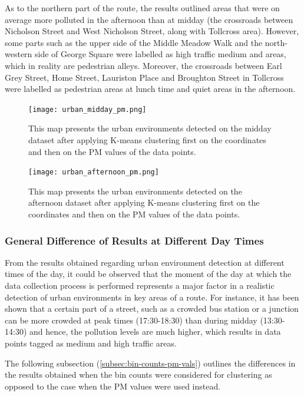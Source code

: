 \documentclass[bsc,frontabs,twoside,singlespacing,parskip,deptreport]{infthesis}     %
\begin{document}
As to the northern part of the route, the results outlined areas that were on average more polluted in the afternoon than at midday (the crossroads between Nicholson Street and West Nicholson Street, along with Tollcross area). However, some parts such as the upper side of the Middle Meadow Walk and the north-western side of George Square were labelled as high traffic medium and areas, which in reality are pedestrian alleys. Moreover, the crossroads between Earl Grey Street, Home Street, Lauriston Place and Broughton Street in Tollcross were labelled as pedestrian areas at lunch time and quiet areas in the afternoon.


\begin{figure}[h!]
  \center
  \texttt{[image: urban\_midday\_pm.png]}
  \caption{This map presents the urban environments detected on the midday dataset after applying K-means clustering first on the coordinates and then on the PM values of the data points.}
  \label{fig:urban_midday_pm}
\end{figure}

\begin{figure}[h!]
  \center
  \texttt{[image: urban\_afternoon\_pm.png]}
  \caption{This map presents the urban environments detected on the afternoon dataset after applying K-means clustering first on the coordinates and then on the PM values of the data points.}
  \label{fig:urban_afternoon_pm}
\end{figure}

\subsubsection*{General Difference of Results at Different Day Times}

From the results obtained regarding urban environment detection at different times of the day, it could be observed that the moment of the day at which the data collection process is performed represents a major factor in a realistic detection of urban environments in key areas of a route. For instance, it has been shown that a certain part of a street, such as a crowded bus station or a junction can be more crowded at peak times (17:30-18:30) than during midday (13:30-14:30) and hence, the pollution levels are much higher, which results in data points tagged as medium and high traffic areas.

The following subsection (\ref{subsec:bin-counts-pm-vals}) outlines the differences in the results obtained when the bin counts were considered for clustering as opposed to the case when the PM values were used instead.
\end{document}
